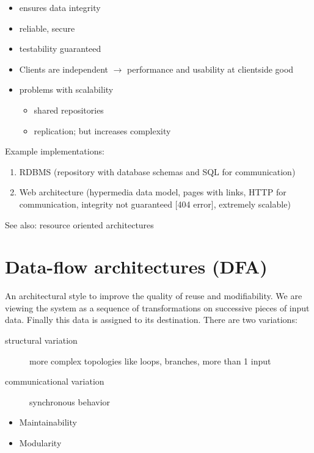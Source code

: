 \documentclass[a4paper]{report}
\begin{document}
\begin{itemize}
  \item ensures data integrity
  \item reliable, secure
  \item testability guaranteed
  \item Clients are independent $\rightarrow$ performance and usability
        at clientside good
  \item problems with scalability
    \begin{itemize}
      \item shared repositories
      \item replication; but increases complexity
    \end{itemize}
\end{itemize}

Example implementations:

\begin{enumerate}
  \item RDBMS (repository with database schemas and SQL for communication)
  \item Web architecture (hypermedia data model, pages with links, HTTP
        for communication, integrity not guaranteed [404 error], extremely
        scalable)
\end{enumerate}

See also: resource oriented architectures

\section{Data-flow architectures (DFA)}

An architectural style to improve the quality of reuse and modifiability.
We are viewing the system as a sequence of transformations on successive
pieces of input data. Finally this data is assigned to its destination.
There are two variations:

\begin{description}
  \item[structural variation]
    more complex topologies like loops, branches, more than 1 input
  \item[communicational variation]
    synchronous behavior
\end{description}

\begin{itemize}
  \item Maintainability
  \item Modularity
\end{itemize}
\end{document}
